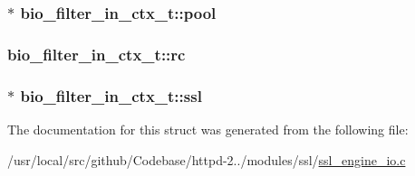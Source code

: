 \subsubsection[{\texorpdfstring{pool}{pool}}]{$\ast$ bio\+\_\+filter\+\_\+in\+\_\+ctx\+\_\+t\+::pool}\hypertarget{structbio__filter__in__ctx__t_a1743f960d31580b2905c826ad01ec8b5}{}\label{structbio__filter__in__ctx__t_a1743f960d31580b2905c826ad01ec8b5}
\subsubsection[{\texorpdfstring{rc}{rc}}]{ bio\+\_\+filter\+\_\+in\+\_\+ctx\+\_\+t\+::rc}\hypertarget{structbio__filter__in__ctx__t_a8dbd97b96459294a59549eab64cd5b48}{}\label{structbio__filter__in__ctx__t_a8dbd97b96459294a59549eab64cd5b48}
\subsubsection[{\texorpdfstring{ssl}{ssl}}]{$\ast$ bio\+\_\+filter\+\_\+in\+\_\+ctx\+\_\+t\+::ssl}\hypertarget{structbio__filter__in__ctx__t_a07e6212e248b0f77c4ed67eed24b8f3a}{}\label{structbio__filter__in__ctx__t_a07e6212e248b0f77c4ed67eed24b8f3a}


The documentation for this struct was generated from the following file\+:\begin{DoxyCompactItemize}
\item 
/usr/local/src/github/\+Codebase/httpd-\/2../modules/ssl/\hyperlink{ssl__engine__io_8c}{ssl\+\_\+engine\+\_\+io.\+c}\end{DoxyCompactItemize}
